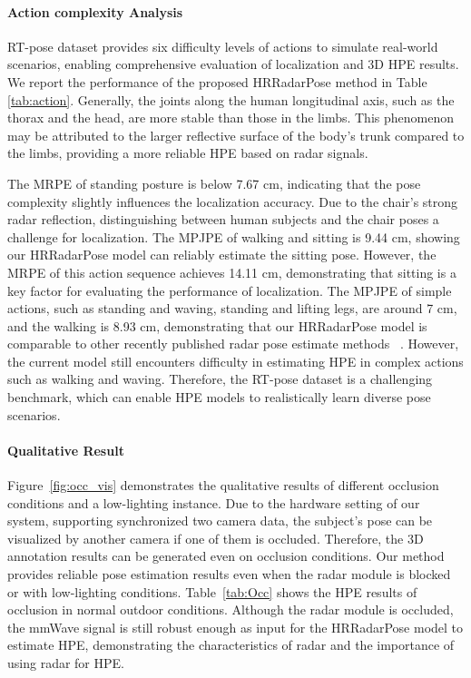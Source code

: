 
\paragraph{Action complexity Analysis}
RT-pose dataset provides six difficulty levels of actions to simulate real-world scenarios, enabling comprehensive evaluation of localization and 3D HPE results. 
We report the performance of the proposed HRRadarPose method in Table \ref{tab:action}. Generally, the joints along the human longitudinal axis, such as the thorax and the head, are more stable than those in the limbs. 
This phenomenon may be attributed to the larger reflective surface of the body's trunk compared to the limbs, providing a more reliable HPE based on radar signals. 

The MRPE of standing posture is below 7.67 cm, indicating that the pose complexity slightly influences the localization accuracy. Due to the chair's strong radar reflection, distinguishing between human subjects and the chair poses a challenge for localization. The MPJPE of walking and sitting is 9.44 cm, showing our HRRadarPose model can reliably estimate the sitting pose. However, the MRPE of this action sequence achieves 14.11 cm, demonstrating that sitting is a key factor for evaluating the performance of localization. The MPJPE of simple actions, such as standing and waving, standing and lifting legs, are around 7 cm, and the walking is 8.93 cm, demonstrating that our HRRadarPose model is comparable to other recently published radar pose estimate methods ~\cite{xie2023rpm,lee2023hupr}. However, the current model still encounters difficulty in estimating HPE in complex actions such as walking and waving. 
Therefore, the RT-pose dataset is a challenging benchmark, which can enable HPE models to realistically learn diverse pose scenarios.


\paragraph{Qualitative Result}




Figure~\ref{fig:occ_vis} demonstrates the qualitative results of different occlusion conditions and a low-lighting instance.
Due to the hardware setting of our system, supporting synchronized two camera data, the subject's pose can be visualized by another camera if one of them is occluded.
Therefore, the 3D annotation results can be generated even on occlusion conditions. 
Our method provides reliable pose estimation results even when the radar module is blocked or with low-lighting conditions.
Table~\ref{tab:Occ} shows the HPE results of occlusion in normal outdoor conditions. Although the radar module is occluded, the mmWave signal is still robust enough as input for the HRRadarPose model to estimate HPE, demonstrating the characteristics of radar and the importance of using radar for HPE.



